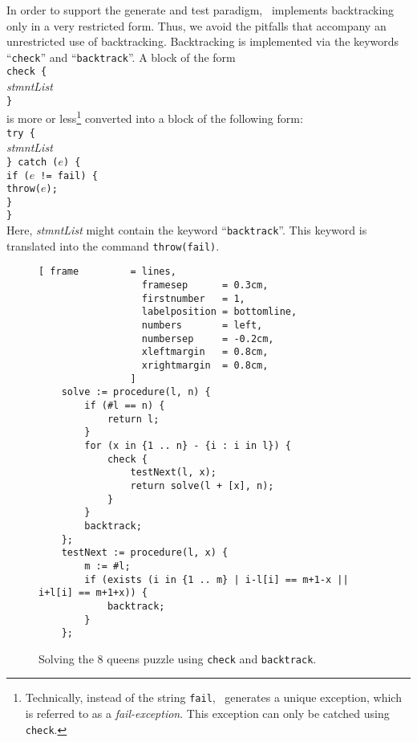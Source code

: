In order to support the generate and test paradigm,  \setlx\ 
implements backtracking only in a very restricted form.  Thus, we avoid the
pitfalls that accompany an unrestricted use of backtracking.
Backtracking is implemented  via the keywords ``\texttt{check}'' and
``\texttt{backtrack}''.  A block of the form
\\[0.2cm]
\hspace*{1.3cm}
\texttt{check \{} 
\\
\hspace*{1.8cm}
\textsl{stmntList}
\\
\hspace*{1.3cm}
\texttt{\}}
\\[0.2cm]
is more or less\footnote{
Technically, instead of the string \texttt{fail}, \setlx\ 
generates a unique exception, which is referred to as a \emph{fail-exception}.
This exception can only be catched using \texttt{check}. 
}
converted into a block of the following form:
\\[0.2cm]
\hspace*{1.3cm}
\texttt{try \{} 
\\
\hspace*{1.8cm}
\textsl{stmntList}
\\
\hspace*{1.3cm}
\texttt{\} catch ($e$) \{}
\\
\hspace*{1.8cm}
\texttt{if ($e$ != fail) \{}
\\
\hspace*{2.3cm}
\texttt{throw($e$);}
\\
\hspace*{1.8cm}
\texttt{\}}
\\
\hspace*{1.3cm}
\texttt{\}}
\\[0.2cm]
Here, \textsl{stmntList}  might contain the keyword ``\texttt{backtrack}''.  This keyword is
translated into the command \texttt{throw(fail)}.   


\begin{figure}[!ht]
\centering
\begin{Verbatim}[ frame         = lines, 
                  framesep      = 0.3cm, 
                  firstnumber   = 1,
                  labelposition = bottomline,
                  numbers       = left,
                  numbersep     = -0.2cm,
                  xleftmargin   = 0.8cm,
                  xrightmargin  = 0.8cm,
                ]
    solve := procedure(l, n) { 
        if (#l == n) {
            return l;
        }
        for (x in {1 .. n} - {i : i in l}) {
            check {
                testNext(l, x);
                return solve(l + [x], n);
            } 
        }
        backtrack;
    };
    testNext := procedure(l, x) {
        m := #l;
        if (exists (i in {1 .. m} | i-l[i] == m+1-x || i+l[i] == m+1+x)) {
            backtrack;
        }
    };
\end{Verbatim}
\vspace*{-0.3cm}
\caption{Solving the 8 queens puzzle using \texttt{check} and \texttt{backtrack}.}
\label{fig:queens-nice.stlx}
\end{figure}

